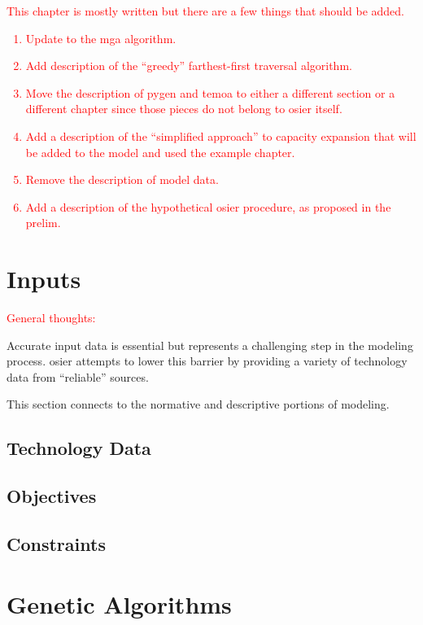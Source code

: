 \textcolor{red}{This chapter is mostly written but there are a few things that
should be added.}

\textcolor{red}{\begin{enumerate}
    \item Update to the \ac{mga} algorithm.
    \item Add description of the ``greedy'' farthest-first traversal algorithm.
    \item Move the description of \ac{pygen} and \ac{temoa} to either a
    different section or a different chapter since those pieces do not belong to
    \ac{osier} itself.
    \item Add a description of the ``simplified approach'' to capacity expansion
    that will be added to the model and used the example chapter.
    \item Remove the description of model data.
    \item Add a description of the hypothetical \ac{osier} procedure, as
    proposed in the prelim.
\end{enumerate}}

\section{Inputs}

\textcolor{red}{General thoughts:}

Accurate input data is essential but represents a challenging step in the
modeling process. \ac{osier} attempts to lower this barrier by providing a
variety of technology data from ``reliable'' sources.

This section connects to the normative and descriptive portions of modeling. 

\subsection{Technology Data}

\subsection{Objectives}

\subsection{Constraints}

\section{Genetic Algorithms}

